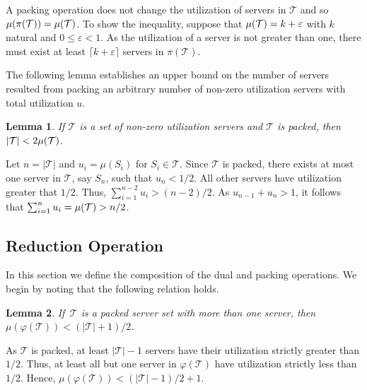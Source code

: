 \documentclass[twocolumn, compsocconf]{IEEEtran}
\newtheorem{lemma}{Lemma}[section]
\newcommand{\dual}{\ensuremath{\varphi}}
\newcommand{\pack}{\ensuremath{\pi}}
\newcommand{\vareps}{\ensuremath{\varepsilon}\xspace}
\newcommand{\servSet}{\ensuremath{\mathcal{T}}}
\begin{document}
\begin{IEEEproof}
  A packing operation does not change the utilization of servers in $\servSet$
  and so $\util(\pack(\servSet)) = \util(\servSet)$. To show the inequality,
  suppose that $\util(\servSet) = k + \vareps$ with $k$ natural and $0 \leqslant
  \vareps < 1$. As the utilization of a server is not greater than one, there
  must exist at least $\lceil k+ \vareps\rceil$ servers in $\pack(\servSet)$.
\end{IEEEproof}

The following lemma establishes an upper bound on the number of servers resulted
from packing an arbitrary number of non-zero utilization servers with total
utilization $u$.

\begin{lemma}\label{lem:packReduc}
  If $\servSet$ is a set of non-zero utilization servers and $\servSet$ is
  packed, then $|\servSet| < 2 \util(\servSet)$.
\end{lemma}

\begin{IEEEproof}
  Let $ n = |\servSet|$ and $u_i = \mu(S_i)$ for $S_i \in \servSet$.  Since
  $\servSet$ is packed, there exists at most one server in $\servSet$, say
  $S_n$, such that $u_n < 1/2$. All other servers have utilization greater that
  $1/2$.  Thus, $\sum_{i=1}^{n-2} u_i > (n-2)/2$. As $u_{n-1} + u_n > 1$, it
  follows that $\sum_{i=1}^n u_i = \util(\servSet) > n/2$.
\end{IEEEproof}


\subsection{Reduction Operation}
\label{sec:dualPackingSched}

In this section we define the composition of the dual and packing operations. We
begin by noting that the following relation holds.

\begin{lemma}\label{lem:dualUtil}
  If $\,\servSet$ is a packed server set with more than one server, then
  $\mu(\dual (\servSet)) < (|\servSet| + 1)/2$.
\end{lemma}

\begin{IEEEproof}
  As $\servSet$ is packed, at least $|\servSet| - 1$ servers have their
  utilization strictly greater than $1/2$. Thus, at least all but one server in
  $\dual(\servSet)$ have utilization strictly less than
  $1/2$. Hence, $\mu(\dual(\servSet)) < (|\servSet|-1)/2+1$.
\end{IEEEproof}
\end{document}
